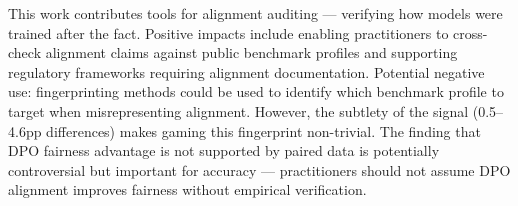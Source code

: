 This work contributes tools for alignment auditing --- verifying how models were trained
after the fact. Positive impacts include enabling practitioners to cross-check alignment
claims against public benchmark profiles and supporting regulatory frameworks requiring
alignment documentation. Potential negative use: fingerprinting methods could be used
to identify which benchmark profile to target when misrepresenting alignment. However,
the subtlety of the signal (0.5--4.6pp differences) makes gaming this fingerprint
non-trivial. The finding that DPO fairness advantage is not supported by paired data
is potentially controversial but important for accuracy --- practitioners should not
assume DPO alignment improves fairness without empirical verification.
